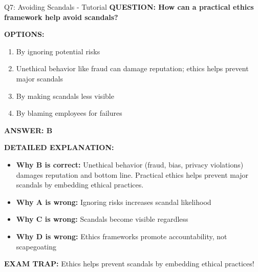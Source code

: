 \documentclass[8pt]{beamer}
\begin{document}
	\begin{frame}{Q7: Avoiding Scandals - Tutorial}
		\fontsize{6.5}{7.5}\selectfont
		\textbf{QUESTION: How can a practical ethics framework help avoid scandals?}
		
		\vspace{0.1cm}
		\textbf{OPTIONS:}
		\begin{enumerate}
			\item By ignoring potential risks
			\item Unethical behavior like fraud can damage reputation; ethics helps prevent major scandals
			\item By making scandals less visible
			\item By blaming employees for failures
		\end{enumerate}
		
		\vspace{0.1cm}
		\textcolor{myblue}{\textbf{ANSWER: B}}
		
		\vspace{0.1cm}
		\textbf{DETAILED EXPLANATION:}
		\begin{itemize}
			\item \textbf{Why B is correct:} Unethical behavior (fraud, bias, privacy violations) damages reputation and bottom line. Practical ethics helps prevent major scandals by embedding ethical practices.
			\item \textbf{Why A is wrong:} Ignoring risks increases scandal likelihood
			\item \textbf{Why C is wrong:} Scandals become visible regardless
			\item \textbf{Why D is wrong:} Ethics frameworks promote accountability, not scapegoating
		\end{itemize}
		
		\textcolor{myred}{\textbf{EXAM TRAP:}} Ethics helps \textcolor{myblue}{prevent scandals} by embedding ethical practices!
	\end{frame}
	
\end{document}
